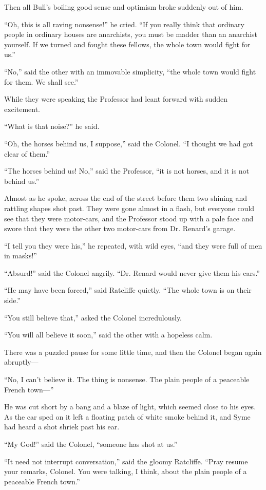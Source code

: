 \documentclass{book}
\begin{document}
Then all Bull’s boiling good sense and optimism broke suddenly out of him.

“Oh, this is all raving nonsense!” he cried. “If you really think that ordinary people in ordinary houses are anarchists, you must be madder than an anarchist yourself. If we turned and fought these fellows, the whole town would fight for us.”

“No,” said the other with an immovable simplicity, “the whole town would fight for them. We shall see.”

While they were speaking the Professor had leant forward with sudden excitement.

“What is that noise?” he said.

“Oh, the horses behind us, I suppose,” said the Colonel. “I thought we had got clear of them.”

“The horses behind us! No,” said the Professor, “it is not horses, and it is not behind us.”

Almost as he spoke, across the end of the street before them two shining and rattling shapes shot past. They were gone almost in a flash, but everyone could see that they were motor-cars, and the Professor stood up with a pale face and swore that they were the other two motor-cars from Dr. Renard’s garage.

“I tell you they were his,” he repeated, with wild eyes, “and they were full of men in masks!”

“Absurd!” said the Colonel angrily. “Dr. Renard would never give them his cars.”

“He may have been forced,” said Ratcliffe quietly. “The whole town is on their side.”

“You still believe that,” asked the Colonel incredulously.

“You will all believe it soon,” said the other with a hopeless calm.

There was a puzzled pause for some little time, and then the Colonel began again abruptly—

“No, I can’t believe it. The thing is nonsense. The plain people of a peaceable French town—”

He was cut short by a bang and a blaze of light, which seemed close to his eyes. As the car sped on it left a floating patch of white smoke behind it, and Syme had heard a shot shriek past his ear.

“My God!” said the Colonel, “someone has shot at us.”

“It need not interrupt conversation,” said the gloomy Ratcliffe. “Pray resume your remarks, Colonel. You were talking, I think, about the plain people of a peaceable French town.”
\end{document}
